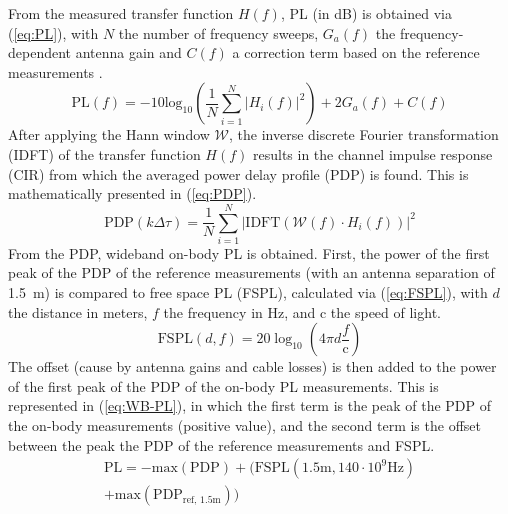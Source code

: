 \documentclass[preprint]{rsl}
\begin{document}
From the measured transfer function $H(f)$, PL (in dB) is obtained via (\ref{eq:PL}), with $N$ the number of frequency sweeps, $G_a(f)$ the frequency-dependent antenna gain and $C(f)$ a correction term based on the reference measurements \cite{DeBeelde2021_eucap}.
\begin{equation}
\label{eq:PL}
\text{PL}(f)= -10 \text{log}_{10} \left( \frac{1}{N} \sum_{i=1}^N | H_i(f) |^2 \right) + 2 G_a(f) + C(f)
\end{equation}
After applying the Hann window $\mathcal{W}$, the inverse discrete Fourier transformation (IDFT) of the transfer function $H(f)$ results in the channel impulse response (CIR) from which the averaged power delay profile (PDP) is found. 
This is mathematically presented in (\ref{eq:PDP}).
\begin{equation}
\text{PDP}(k\Delta\tau) = \frac{1}{N} \sum_{i=1}^N | \text{IDFT}(\mathcal{W}(f) \cdot H_i(f)) |^2
\label{eq:PDP}
\end{equation}
From the PDP, wideband on-body PL is obtained. 
First, the power of the first peak of the PDP of the reference measurements (with an antenna separation of 1.5~m) is compared to free space PL (FSPL), calculated via (\ref{eq:FSPL}), with $d$ the distance in meters, $f$ the frequency in Hz, and c the speed of light. 
\begin{equation}
\text{FSPL}(d,f)= 20 \log_{10} \left( 4 \pi d \frac{f}{\text{c}}\right)
\label{eq:FSPL}
\end{equation}
The offset (cause by antenna gains and cable losses) is then added to the power of the first peak of the PDP of the on-body PL measurements. 
This is represented in (\ref{eq:WB-PL}), in which the first term is the peak of the PDP of the on-body measurements (positive value), and the second term is the offset between the peak the PDP of the reference measurements and FSPL.
\begin{multline}
\text{PL} = - \text{max}(\text{PDP})  + (\text{FSPL}(1.5 \text{m}, 140\cdot10^9 \text{Hz}) \\ + \text{max}(\text{PDP}_\text{ref, 1.5m}) )
\label{eq:WB-PL}
\end{multline}
\end{document}
